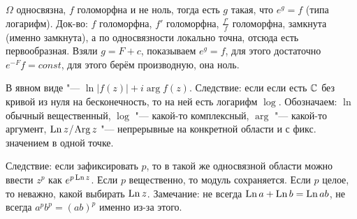 \section{} %
	$\Omega$ односвязна, $f$ голоморфна и не ноль, тогда есть $g$ такая, что $e^g=f$ (типа логарифм).
	Док-во: $f$ голоморфна, $f'$ голоморфна, $\frac{f'}{f}$ голоморфна, замкнута (именно замкнута),
	а по односвязности локально точна, отсюда есть первообразная.
	Взяли $g=F+c$, показываем $e^g=f$, для этого достаточно $e^{-F}f=const$,
	для этого берём производную, она ноль.

	В явном виде "--- $\ln|f(z)| + i\arg f(z)$.
	Следствие: если если есть $\mathbb{C}$ без кривой из нуля на бесконечность, то на ней есть логарифм $\log$.
	Обозначаем: $\ln$ обычный вещественный, $\log$ "--- какой-то комплексный, $\arg$ "--- какой-то аргумент,
	$\operatorname{Ln} z$/$\operatorname{Arg} z$ "--- непрерывные на конкретной области и с фикс. значением в одной точке.
	
	Следствие: если зафиксировать $p$, то в такой же односвязной области можно ввести $z^p$ как $e^{p \operatorname{Ln} z}$.
	Если $p$ вещественно, то модуль сохраняется.
	Если $p$ целое, то неважно, какой выбирать $\operatorname{Ln} z$.
	Замечание: не всегда $\operatorname{Ln} a + \operatorname{Ln} b = \operatorname{Ln} ab$, не всегда $a^pb^p=(ab)^p$ именно из-за этого.

\section{} %
	\TODO

\section{} %
	\TODO

\section{} %
	\TODO

\section{} %
	\TODO

\section{} %
	\TODO

\section{} %
	\TODO

\section{} %
	\TODO

\section{} %
	\TODO

\section{} %
	\TODO
